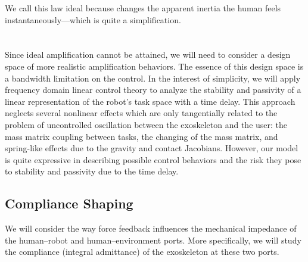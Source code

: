 We call this law ideal because  changes the apparent inertia the human feels instantaneously---which is quite a simplification.




\section{}\label{sec:fd}

Since ideal amplification cannot be attained, we will need to consider a design space of more realistic amplification behaviors. The essence of this design space is a bandwidth limitation on the control. In the interest of simplicity, we will apply frequency domain linear control theory to analyze the stability and passivity of a linear representation of the robot's task space with a time delay. This approach neglects several nonlinear effects which are only tangentially related to the problem of uncontrolled oscillation between the exoskeleton and the user: the mass matrix coupling between tasks, the changing of the mass matrix, and spring-like effects due to the gravity and contact Jacobians. However, our model is quite expressive in describing possible control behaviors and the risk they pose to stability and passivity due to the time delay.

\subsection{Compliance Shaping}
We will consider the way force feedback influences the mechanical impedance of the human--robot and human--environment ports. More specifically, we will study the compliance (integral admittance) of the exoskeleton at these two ports.

